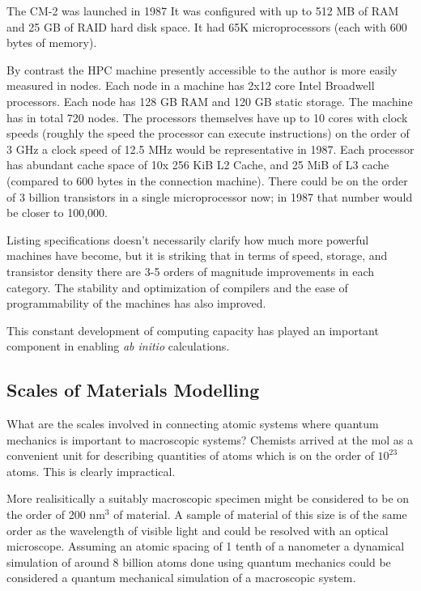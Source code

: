 The CM-2 was launched in 1987 It was configured with up to 512 MB of RAM and 25 GB of RAID
hard disk space. It had 65K microprocessors (each with 600 bytes of memory). 

By contrast the HPC machine presently accessible to the author 
is more easily measured in nodes. Each node in a machine has 2x12 core Intel Broadwell processors.
Each node has 128 GB RAM and 120 GB static storage. The machine has in total 720 nodes. 
The processors themselves have up to 10 cores with clock speeds (roughly the speed the
processor can execute instructions) on the order of 3 GHz a clock speed of 12.5 MHz would be representative in 1987. 
Each processor has abundant cache space of 10x 256 KiB L2 Cache, and 25 MiB of L3 cache 
(compared to 600 bytes in the connection machine). 
There could be on the order of 3 billion transistors in a single microprocessor now;
in 1987 that number would be closer to 100,000. 

Listing specifications doesn't necessarily clarify how much more powerful machines have become, 
but it is striking that in terms of speed, storage, and transistor density there are 3-5 orders of magnitude 
improvements in each category. The stability and optimization of compilers and the ease of programmability
of the machines has also improved.

This constant development of computing capacity has played an important component in enabling
{\it ab initio} calculations. 

\subsection{Scales of Materials Modelling}
What are the scales involved in connecting atomic systems where quantum mechanics is important
to macroscopic systems? Chemists arrived at the mol as a convenient unit for describing
quantities of atoms which is on the order of $10^{23}$ atoms. This is clearly impractical.

More realisitically a suitably macroscopic specimen might be considered to be on the 
order of 200 nm$^{3}$ of material. A sample of material of this size is of the 
same order as the wavelength of visible light and could be
resolved with an optical microscope. Assuming an atomic spacing of 1 tenth of a nanometer 
a dynamical simulation of around 8 billion atoms done using quantum mechanics 
could be considered a quantum mechanical simulation of a macroscopic system. 

